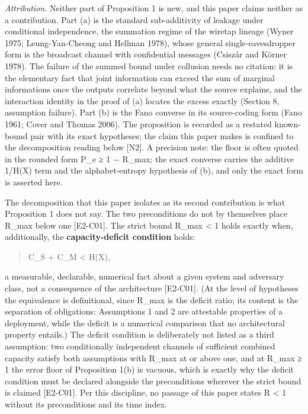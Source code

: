 \documentclass[
  11pt,
]{article}
\begin{document}
\emph{Attribution.} Neither part of Proposition 1 is new, and this paper
claims neither as a contribution. Part (a) is the standard
sub-additivity of leakage under conditional independence, the summation
regime of the wiretap lineage (Wyner 1975; Leung-Yan-Cheong and Hellman
1978), whose general single-eavesdropper form is the broadcast channel
with confidential messages (Csiszár and Körner 1978). The failure of the
summed bound under collusion needs no citation: it is the elementary
fact that joint information can exceed the sum of marginal informations
once the outputs correlate beyond what the source explains, and the
interaction identity in the proof of (a) locates the excess exactly
(Section 8, assumption failure). Part (b) is the Fano converse in its
source-coding form (Fano 1961; Cover and Thomas 2006). The proposition
is recorded as a restated known-bound pair with its exact hypotheses;
the claim this paper makes is confined to the decomposition reading
below {[}N2{]}. A precision note: the floor is often quoted in the
rounded form P\_e ≥ 1 − R\_max; the exact converse carries the additive
1/H(X) term and the alphabet-entropy hypothesis of (b), and only the
exact form is asserted here.

The decomposition that this paper isolates as its second contribution is
what Proposition 1 does not say. The two preconditions do not by
themselves place R\_max below one {[}E2-C01{]}. The strict bound R\_max
\textless{} 1 holds exactly when, additionally, the
\textbf{capacity-deficit condition} holds:

\begin{quote}
C\_S + C\_M \textless{} H(X),
\end{quote}

a measurable, declarable, numerical fact about a given system and
adversary class, not a consequence of the architecture {[}E2-C01{]}. (At
the level of hypotheses the equivalence is definitional, since R\_max is
the deficit ratio; its content is the separation of obligations:
Assumptions 1 and 2 are attestable properties of a deployment, while the
deficit is a numerical comparison that no architectural property
entails.) The deficit condition is deliberately not listed as a third
assumption: two conditionally independent channels of sufficient
combined capacity satisfy both assumptions with R\_max at or above one,
and at R\_max ≥ 1 the error floor of Proposition 1(b) is vacuous, which
is exactly why the deficit condition must be declared alongside the
preconditions wherever the strict bound is claimed {[}E2-C01{]}. Per
this discipline, no passage of this paper states R \textless{} 1 without
its preconditions and its time index.
\end{document}

